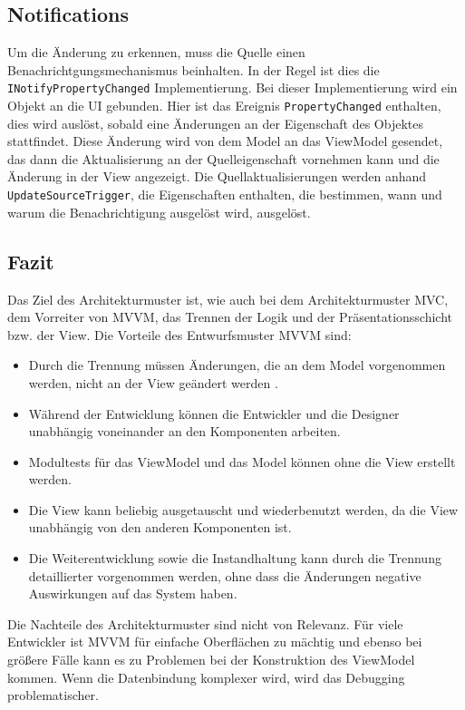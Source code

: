 \subsection*{Notifications}
Um die \"Anderung zu erkennen, muss die Quelle einen Benachrichtgungsmechanismus beinhalten. In der Regel ist dies die \texttt{INotifyPropertyChanged} Implementierung. Bei dieser Implementierung wird ein Objekt an die \ac{UI} gebunden. Hier ist das Ereignis \texttt{PropertyChanged} enthalten, dies wird ausl\"ost, sobald eine \"Anderungen an der Eigenschaft des Objektes stattfindet. Diese \"Anderung wird von dem Model an das ViewModel gesendet, das dann die Aktualisierung an der Quelleigenschaft vornehmen kann und die \"Anderung in der View angezeigt.
Die Quellaktualisierungen werden anhand \texttt{UpdateSourceTrigger}, die Eigenschaften enthalten, die bestimmen, wann und warum die Benachrichtigung ausgel\"ost wird,  ausgel\"ost. 


\subsection*{Fazit}
Das Ziel des Architekturmuster ist, wie auch bei dem Architekturmuster \ac{MVC}, dem Vorreiter von \ac{MVVM}, das Trennen der Logik und der Pr\"asentationsschicht bzw. der View.
Die Vorteile des Entwurfsmuster \ac{MVVM} sind:
\begin{itemize}
\item Durch die Trennung m\"ussen \"Anderungen, die an dem Model vorgenommen werden, nicht an der View ge\"andert werden\cite{tutorialspointMVVM} .
\item W\"ahrend der Entwicklung k\"onnen die Entwickler und die Designer unabh\"angig voneinander an den Komponenten arbeiten\cite{Pete2016}.
\item Modultests f\"ur das ViewModel und das Model k\"onnen ohne die View erstellt werden\cite{Pete2016}.
\item Die View kann beliebig ausgetauscht und wiederbenutzt werden, da die View unabh\"angig von den anderen Komponenten ist\cite{Pete2016}.
\item Die Weiterentwicklung sowie die Instandhaltung kann durch die Trennung detaillierter vorgenommen werden, ohne dass die  \"Anderungen negative Auswirkungen auf das System haben\cite{tutorialspointMVVM}.
\end{itemize}
Die Nachteile des Architekturmuster sind nicht von Relevanz.
F\"ur viele Entwickler ist \ac{MVVM} f\"ur einfache Oberfl\"achen zu m\"achtig und ebenso bei gr\"o\ss{}ere F\"alle kann es zu Problemen bei der Konstruktion des ViewModel kommen.
Wenn die Datenbindung komplexer wird, wird das Debugging problematischer\cite{tutorialspointMVVM}.

